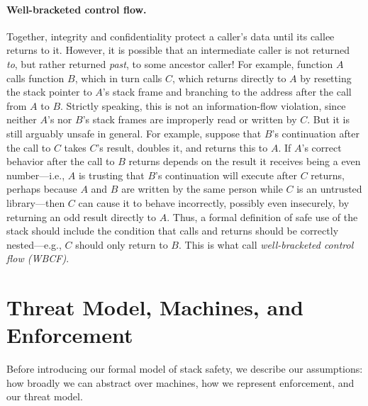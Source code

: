 \documentclass[acmsmall,review,anonymous]{acmart}\settopmatter{printfolios=true,printccs=false,printacmref=false}
\begin{document}
{\paragraph{Well-bracketed control flow.} Together,
integrity and confidentiality protect a caller's data until its callee
returns to it. However, it is possible that an intermediate caller is not
returned {\em to}, but rather returned {\em past}, to some ancestor caller!
For example, function $A$ calls function $B$, which in turn calls $C$, which
returns directly to $A$ by resetting the stack pointer to $A$'s stack frame
and branching to the address after the call from $A$ to $B$.  Strictly
speaking, this is not an information-flow violation, since neither $A$'s nor
$B$'s stack frames are improperly read or written by $C$.  But it is still
arguably unsafe in general.  For example, suppose that $B$'s continuation
after the call to $C$ takes $C$'s result, doubles it, and returns this to
$A$.  If $A$'s correct behavior after the call to $B$ returns depends on the
result it receives being a even number---i.e., $A$ is trusting that $B$'s
continuation will execute after $C$ returns, perhaps because $A$ and $B$ are
written by the same person while $C$ is an untrusted library---then $C$ can
cause it to behave incorrectly, possibly even insecurely, by returning an
odd result directly to $A$.
%
Thus, a formal definition of safe use of the stack should include the
condition that calls and returns should be correctly nested---e.g., $C$ should
only return to $B$.  This is what \citet{SkorstengaardSTKJFP}
call \emph{well-bracketed control flow (WBCF)}.

\section{Threat Model, Machines, and Enforcement }
\label{sec:setup}
\label{sec:threat}

Before introducing our formal model of stack safety, we describe our assumptions:
how broadly we can abstract over machines, how we represent enforcement, and
our threat model.

}
\end{document}
